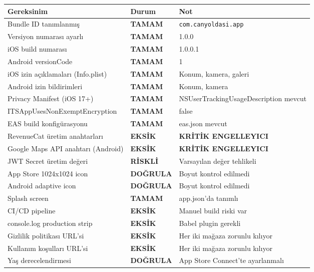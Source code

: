 \documentclass[12pt,a4paper]{article}
\begin{document}
\begin{longtable}{p{}p{}p{}}
\toprule
\textbf{Gereksinim} & \textbf{Durum} & \textbf{Not} \\
\midrule
\endhead
Bundle ID tanımlanmış & \textcolor{low}{\textbf{TAMAM}} & \texttt{com.canyoldasi.app} \\
\rowcolor{rowgray}
Versiyon numarası ayarlı & \textcolor{low}{\textbf{TAMAM}} & 1.0.0 \\
iOS build numarası & \textcolor{low}{\textbf{TAMAM}} & 1.0.0.1 \\
\rowcolor{rowgray}
Android versionCode & \textcolor{low}{\textbf{TAMAM}} & 1 \\
iOS izin açıklamaları (Info.plist) & \textcolor{low}{\textbf{TAMAM}} & Konum, kamera, galeri \\
\rowcolor{rowgray}
Android izin bildirimleri & \textcolor{low}{\textbf{TAMAM}} & Konum, kamera \\
Privacy Manifest (iOS 17+) & \textcolor{low}{\textbf{TAMAM}} & NSUserTrackingUsageDescription mevcut \\
\rowcolor{rowgray}
ITSAppUsesNonExemptEncryption & \textcolor{low}{\textbf{TAMAM}} & false \\
EAS build konfigürasyonu & \textcolor{low}{\textbf{TAMAM}} & eas.json mevcut \\
\rowcolor{rowgray}
RevenueCat üretim anahtarları & \textcolor{critical}{\textbf{EKSİK}} & \textbf{KRİTİK ENGELLEYICI} \\
Google Maps API anahtarı (Android) & \textcolor{critical}{\textbf{EKSİK}} & \textbf{KRİTİK ENGELLEYICI} \\
\rowcolor{rowgray}
JWT Secret üretim değeri & \textcolor{critical}{\textbf{RİSKLİ}} & Varsayılan değer tehlikeli \\
App Store 1024x1024 icon & \textcolor{medium}{\textbf{DOĞRULA}} & Boyut kontrol edilmedi \\
\rowcolor{rowgray}
Android adaptive icon & \textcolor{medium}{\textbf{DOĞRULA}} & Boyut kontrol edilmedi \\
Splash screen & \textcolor{low}{\textbf{TAMAM}} & app.json'da tanımlı \\
\rowcolor{rowgray}
CI/CD pipeline & \textcolor{medium}{\textbf{EKSİK}} & Manuel build riski var \\
console.log production strip & \textcolor{medium}{\textbf{EKSİK}} & Babel plugin gerekli \\
\rowcolor{rowgray}
Gizlilik politikası URL'si & \textcolor{medium}{\textbf{EKSİK}} & Her iki mağaza zorunlu kılıyor \\
Kullanım koşulları URL'si & \textcolor{medium}{\textbf{EKSİK}} & Her iki mağaza zorunlu kılıyor \\
\rowcolor{rowgray}
Yaş derecelendirmesi & \textcolor{medium}{\textbf{DOĞRULA}} & App Store Connect'te ayarlanmalı \\
\bottomrule
\end{longtable}
\end{document}
